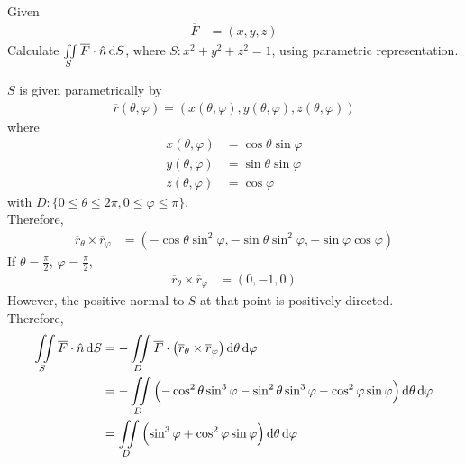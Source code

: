 \documentclass[fleqn, a4paper, 8pt, twoside]{amsart}
\theoremstyle{definition}
\theoremstyle{bluedefinition}
\theoremstyle{redtheorem}
\begin{document}
\begin{multicols}{2}
\begin{spacing}{0.7}
\begin{question}
	Given
	\begin{align*}
		\overline{F} & = (x,y,z)
	\end{align*}
	Calculate $\iint\limits_{S} \overline{F} \cdot \hat{n} \dif S$, where $S : x^2 + y^2 + z^2 = 1$, using parametric representation.
\end{question}

\begin{solution}
	$S$ is given parametrically by
	\begin{align*}
		\overline{r}(\theta,\varphi) = \left( x(\theta,\varphi) , y(\theta,\varphi) , z(\theta,\varphi) \right)
	\end{align*}
	where
	\begin{align*}
		x(\theta,\varphi) & = \cos \theta \sin \varphi \\
		y(\theta,\varphi) & = \sin \theta \sin \varphi \\
		z(\theta,\varphi) & = \cos \varphi
	\end{align*}
	with $D : \{0 \le \theta \le 2 \pi , 0 \le \varphi \le \pi\}$.\\
	Therefore,
	\begin{align*}
		\overline{r}_{\theta} \times \overline{r}_{\varphi} & = \left( -\cos \theta \sin^2 \varphi , -\sin \theta \sin^2 \varphi , -\sin \varphi \cos \varphi \right)
	\end{align*}
	If $\theta = \frac{\pi}{2}$, $\varphi = \frac{\pi}{2}$,
	\begin{align*}
		\overline{r}_{\theta} \times \overline{r}_{\varphi} & = (0,-1,0)
	\end{align*}
	However, the positive normal to $S$ at that point is positively directed.\\
	Therefore,
	\begin{align*}
		\iint\limits_{S} \overline{F} \cdot \hat{n} \dif S & = -\iint\limits_{D} \overline{F} \cdot \left( \overline{r}_{\theta} \times \overline{r}_{\varphi} \right) \dif \theta \dif \varphi                     \\
                                                                   & = -\iint\limits_{D} \left( -\cos^2 \theta \sin^3 \varphi - \sin^2 \theta \sin^3 \varphi - \cos^2 \varphi \sin \varphi \right) \dif \theta \dif \varphi \\
                                                                   & = \iint\limits_{D} \left( \sin^3 \varphi + \cos^2 \varphi \sin \varphi \right) \dif \theta \dif \varphi                                                \\

\end{align*}
\end{solution}
\end{spacing}
\end{multicols}
\end{document}
